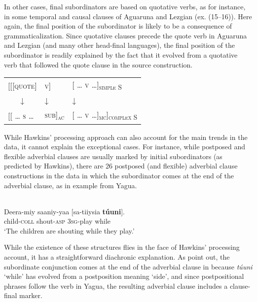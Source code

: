 \documentclass[output=paper]{langsci/langscibook}
\begin{document}
In other cases, final subordinators are based on quotative verbs, as for instance, in some temporal and causal clauses of Aguaruna and Lezgian (ex. (15–16)). Here again, the final position of the subordinator is likely to be a consequence of grammaticalization. Since quotative clauses precede the quote verb in Aguaruna and Lezgian (and many other head-final languages), the final position of the subordinator is readily explained by the fact that it evolved from a quotative verb that followed the quote clause in the source construction. 

\ea\label{ex:diessel:20}
\begin{tabular}[t]{@{}l@{ }ll@{}}
{[[\textsc{[quote]}} &   {\textsc{v]}}  & {[ \textsc{… v …]\textsubscript{simple S}}}\\
\multicolumn{1}{c}{↓}  & ↓ & {[ \textsc{… }}↓\\
{[[ \textsc{… s …}} & {\textsc{sub]\textsubscript{ac}}} &  {[ \textsc{… v …]\textsubscript{mc}]\textsubscript{complex S}}}\\
\end{tabular}
\z

While Hawkins’ processing approach can also account for the main trends in the data, it cannot explain the exceptional cases. For instance, while postposed and flexible adverbial clauses are usually marked by initial subordinators (as predicted by Hawkins), there are 26 postposed (and flexible) adverbial clause constructions in the data in which the subordinator comes at the end of the adverbial clause, as in example  from Yagua.

\ea\label{ex:diessel:21}
\\
\gll   Deera-miy  saaniy-yaa  [sa-tiiysia  \textbf{túuni}].\\
       child-\textsc{coll}  shout-\textsc{asp}  3\textsc{sg}-play  while\\
\glt   `The children are shouting while they play.'
\z

While the existence of these structures flies in the face of Hawkins’ processing account, it has a straightforward diachronic explanation. As \citet[340]{PaynePayne1990} point out, the subordinate conjunction comes at the end of the adverbial clause in  because \textit{túuni} ‘while’ has evolved from a postposition meaning ‘side’, and since postpositional phrases follow the verb in Yagua, the resulting adverbial clause includes a clause-final marker.
\end{document}

